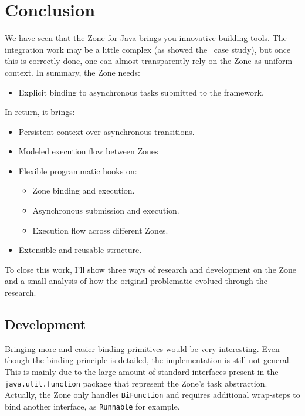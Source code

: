 
\chapter{Conclusion}
\label{ch:conclusion}

We have seen that the Zone for Java brings you innovative building tools. The integration work may be a little complex (as showed the \vertx\ case study), but once this is correctly done, one can almost transparently rely on the Zone as uniform context. In summary, the Zone needs:
\begin{itemize}
\item Explicit binding to asynchronous tasks submitted to the framework.
\end{itemize}

In return, it brings:
\begin{itemize}
\item Persistent context over asynchronous transitions.
\item Modeled execution flow between Zones
\item Flexible programmatic hooks on:
  \begin{itemize}
  \item Zone binding and execution.
  \item Asynchronous submission and execution.
  \item Execution flow across different Zones.
  \end{itemize}
\item Extensible and reusable structure.
\end{itemize}

To close this work, I'll show three ways of research and development on the Zone and a small analysis of how the original problematic evolued through the research.

\section{Development}

Bringing more and easier binding primitives would be very interesting. Even though the binding principle is detailed, the implementation is still not general. This is mainly due to the large amount of standard interfaces present in the \lstinline{java.util.function} package that represent the Zone's task abstraction. Actually, the Zone only handles \lstinline{BiFunction} and requires additional wrap-steps to bind another interface, as \lstinline{Runnable} for example.

